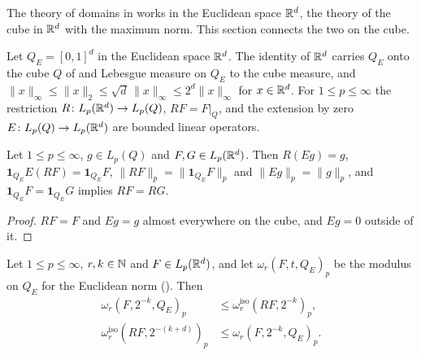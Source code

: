 The theory of domains in  works in the Euclidean space $\mathbb{R}^d$, the
theory of the cube in $\mathbb{R}^d$ with the maximum norm. This section connects the two on the cube.

\begin{definition}
\label{def:euclidean-cube}
\leanok
{}
Let $Q_E = [0, 1]^d$ in the Euclidean space $\mathbb{R}^d$. The identity of $\mathbb{R}^d$ carries $Q_E$ onto
the cube $Q$ of  and Lebesgue measure on $Q_E$ to the cube measure, and
$\|x\|_\infty \leq \|x\|_2 \leq \sqrt{d} \, \|x\|_\infty \leq 2^d \|x\|_\infty$ for
$x \in \mathbb{R}^d$. For $1 \leq p \leq \infty$ the restriction $R \colon L_p(\mathbb{R}^d) \to L_p(Q)$,
$R F = F|_Q$, and the extension by zero $E \colon L_p(Q) \to L_p(\mathbb{R}^d)$ are bounded linear
operators.
\end{definition}

\begin{lemma}
\label{lem:euclidean-cube-transport}
\leanok
{}
Let $1 \leq p \leq \infty$, $g \in L_p(Q)$ and $F, G \in L_p(\mathbb{R}^d)$. Then $R(E g) = g$,
$\mathbf 1_{Q_E} E(R F) = \mathbf 1_{Q_E} F$, $\|R F\|_p = \|\mathbf 1_{Q_E} F\|_p$ and
$\|E g\|_p = \|g\|_p$, and $\mathbf 1_{Q_E} F = \mathbf 1_{Q_E} G$ implies $R F = R G$.
\end{lemma}

\begin{proof}
\leanok
{}
$R F = F$ and $E g = g$ almost everywhere on the cube, and $E g = 0$ outside of it.
\end{proof}

\begin{lemma}
\label{lem:euclidean-cube-moduli}
\leanok
{}
Let $1 \leq p \leq \infty$, $r, k \in \mathbb{N}$ and $F \in L_p(\mathbb{R}^d)$, and let
$\omega_r(F, t, Q_E)_p$ be the modulus on $Q_E$ for the Euclidean norm
(). Then
\begin{align*}
  \omega_r(F, 2^{-k}, Q_E)_p &\leq \omega^{\mathrm{iso}}_r(R F, 2^{-k})_p , \\
  \omega^{\mathrm{iso}}_r(R F, 2^{-(k+d)})_p &\leq \omega_r(F, 2^{-k}, Q_E)_p .
\end{align*}
\end{lemma}

